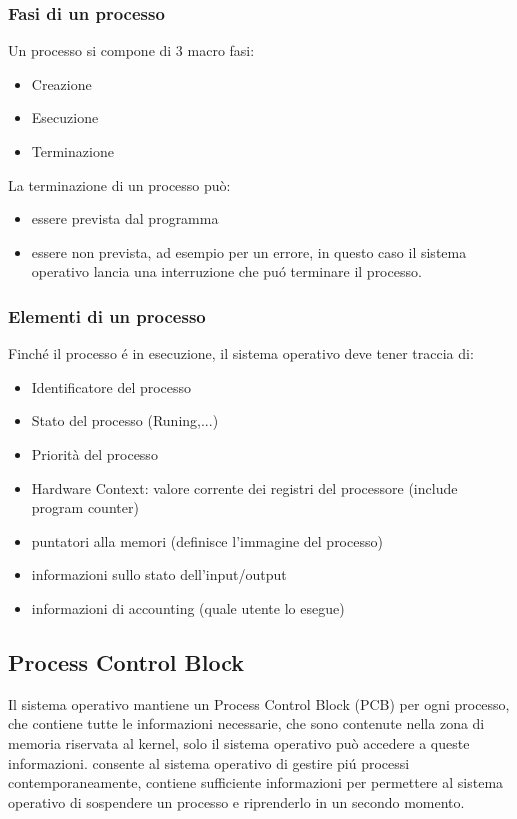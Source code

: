\subsubsection{Fasi di un processo}
Un processo si compone di 3 macro fasi:
\begin{itemize}
    \item Creazione
    \item Esecuzione
    \item Terminazione
\end{itemize}
La terminazione di un processo può:
\begin{itemize}
    \item essere prevista dal programma
    \item essere non prevista, ad esempio per un errore, in questo caso il sistema operativo lancia una interruzione che puó terminare il processo.
\end{itemize}
\subsubsection{Elementi di un processo}
Finché il processo é in esecuzione, il sistema operativo deve tener traccia di:
\begin{itemize}
    \item Identificatore del processo
    \item Stato del processo (Runing,...)
    \item Priorità del processo
    \item Hardware Context: valore corrente dei registri del processore (include program counter)
    \item puntatori alla memori (definisce l'immagine del processo)
    \item informazioni sullo stato dell'input/output
    \item informazioni di accounting (quale utente lo esegue)
\end{itemize}
\subsection{Process Control Block}
Il sistema operativo mantiene un Process Control Block (PCB) per ogni processo, che contiene tutte le informazioni necessarie,
che sono contenute nella zona di memoria riservata al kernel, solo il sistema operativo può accedere a queste informazioni.
consente al sistema operativo di gestire piú processi contemporaneamente, contiene sufficiente informazioni per permettere
al sistema operativo di sospendere un processo e riprenderlo in un secondo momento.
